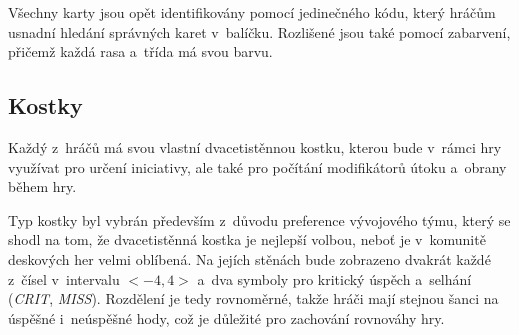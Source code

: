 Všechny karty jsou opět identifikovány pomocí jedinečného kódu, který hráčům usnadní hledání správných karet v~balíčku. Rozlišené jsou také pomocí zabarvení, přičemž každá rasa a~třída má svou barvu.

\subsection{Kostky}
\label{subsec:design_dice}

Každý z~hráčů má svou vlastní dvacetistěnnou kostku, kterou bude v~rámci hry využívat pro určení iniciativy, ale také pro počítání modifikátorů útoku a~obrany během hry.

Typ kostky byl vybrán především z~důvodu preference vývojového týmu, který se shodl na tom, že dvacetistěnná kostka je nejlepší volbou, neboť je v~komunitě deskových her velmi oblíbená. Na jejích stěnách bude zobrazeno dvakrát každé z~čísel v~intervalu $<-4, 4>$ a~dva symboly pro kritický úspěch a~selhání (\textit{CRIT}, \textit{MISS}). Rozdělení je tedy rovnoměrné, takže hráči mají stejnou šanci na úspěšné i~neúspěšné hody, což je důležité pro zachování rovnováhy hry.
